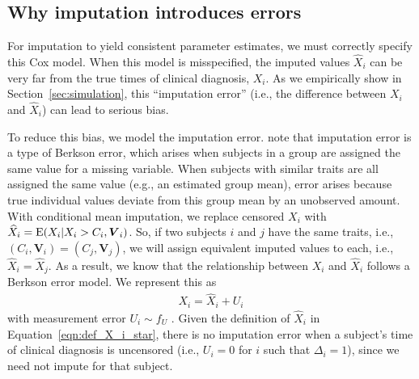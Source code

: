 \documentclass[12pt]{article}
\def\bse{\begin{eqnarray*}}
\def\ese{\end{eqnarray*}}
\def\bse{\begin{eqnarray*}}
\def\ese{\end{eqnarray*}}
\def\btheta{{\boldsymbol{\theta}}}
\def\bV{{\boldsymbol V}}
\begin{document}
\subsection{Why imputation introduces errors}
\label{sec:berkson}
For imputation to yield consistent parameter estimates, we must correctly specify this Cox model. When this model is misspecified, the imputed values $\widehat{X}_i$ can be very far from the true times of clinical diagnosis, $X_i$. As we empirically show in Section~\ref{sec:simulation}, this ``imputation error'' (i.e., the difference between $X_i$ and $\widehat{X}_i$) can lead to serious bias.

To reduce this bias, we model the imputation error. \cite{haber2020bias} note that imputation error is a type of Berkson error, which arises when subjects in a group are assigned the same value for a missing variable. When subjects with similar traits are all assigned the same value (e.g., an estimated group mean), error arises because true individual values deviate from this group mean by an unobserved amount. With conditional mean imputation, we replace censored $X_i$ with $\widehat{X}_i={\rm E}(X_i|X_i>C_i,\bV_i)$. So, if two subjects $i$ and $j$ have the same traits, i.e., $(C_i, \bV_i) = (C_j, \bV_j)$, we will assign equivalent imputed values to each, i.e., $\widehat{X}_i = \widehat{X}_j$. As a result, we know that the relationship between $X_i$ and $\widehat{X}_i$ follows a Berkson error model. We represent this as
\bse
X_i = \widehat{X}_i + U_i
\ese
with measurement error $U_i\sim f_U$ \citep{Carrolletal2006}. 
Given the definition of $\widehat{X}_i$ in Equation~\eqref{eqn:def_X_i_star}, there is no imputation error when a subject's time of clinical diagnosis is uncensored (i.e., $U_i=0$ for $i$ such that $\Delta_i=1$), since we need not impute for that subject.
\end{document}

